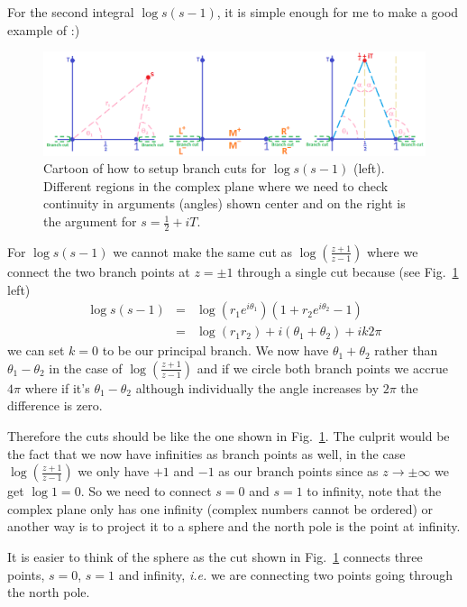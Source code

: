 \documentclass[aps,preprint,preprintnumbers,nofootinbib,showpacs,prd]{revtex4-1}
\newcommand{\ie}{{\it i.e.} }
\newcommand{\nbea}{\begin{eqnarray*}}
\newcommand{\neea}{\end{eqnarray*}}
\begin{document}
For the second integral $\log s(s-1)$, it is simple enough for me to make a good example of :)
%
\begin{figure}
\centering
  \includegraphics[width=1.08\linewidth]{branch1.png}
  \caption{Cartoon of how to setup branch cuts for $\log s(s-1)$ (left). Different regions in the complex plane where we need to check continuity in arguments (angles) shown center and on the right is the argument for $s = \tfrac{1}{2} + iT$.}
\label{fig:branch1}
\end{figure}
%

For $\log s(s-1)$ we cannot make the same cut as $\log \left ( \frac{z + 1}{z - 1} \right)$ where we connect the two branch points at $z = \pm 1$ through a single cut because (see Fig.~\ref{fig:branch1} left)
%
\nbea
\log s(s-1) & = & \log (r_1 e^{i\theta_1})(1 + r_2e^{i\theta_2} - 1) \\
& = & \log (r_1r_2) + i(\theta_1 + \theta_2) + ik2\pi
\neea
%
we can set $k=0$ to be our principal branch. We now have $\theta_1 + \theta_2$ rather than $\theta_1 - \theta_2$ in the case of $\log \left ( \frac{z + 1}{z - 1} \right)$ and if we circle both branch points we accrue $4\pi$ where if it's $\theta_1 - \theta_2$ although individually the angle increases by $2\pi$ the difference is zero.

Therefore the cuts should be like the one shown in Fig.~\ref{fig:branch1}. The culprit would be the fact that we now have infinities as branch points as well, in the case $\log \left ( \frac{z + 1}{z - 1} \right)$ we only have $+1$ and $-1$ as our branch points since as $z \to \pm \infty$ we get $\log 1 = 0$. So we need to connect $s = 0$ and $s = 1$ to infinity, note that the complex plane only has one infinity (complex numbers cannot be ordered) or another way is to project it to a sphere and the north pole is the point at infinity.

It is easier to think of the sphere as the cut shown in Fig.~\ref{fig:branch1} connects three points, $s = 0$, $s = 1$ and infinity, \ie we are connecting two points going through the north pole.
\end{document}
